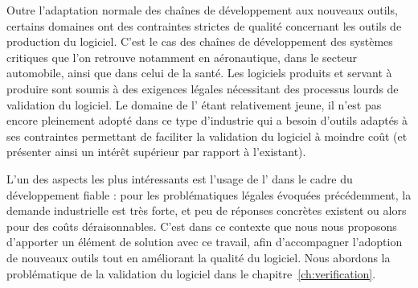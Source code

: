 Outre l'adaptation normale des chaînes de développement aux nouveaux outils,
certains domaines ont des contraintes strictes de qualité concernant les outils
de production du logiciel. C'est le cas des chaînes de développement des
systèmes critiques que l'on retrouve notamment en aéronautique, dans le secteur
automobile, ainsi que dans celui de la santé. Les logiciels produits et servant
à produire sont soumis à des exigences légales nécessitant des processus lourds
de validation du logiciel. Le domaine de l'{\idm} étant relativement
jeune, il n'est pas encore pleinement adopté dans ce type d'industrie qui a
besoin d'outils adaptés à ses contraintes permettant de faciliter la validation
du logiciel à moindre coût (et présenter ainsi un intérêt supérieur par rapport
à l'existant).

L'un des aspects les plus intéressants est l'usage de l'{\idm} dans le cadre du
développement fiable : pour les problématiques légales évoquées précédemment, la
demande industrielle est très forte, et peu de réponses concrètes existent ou
alors pour des coûts déraisonnables. C'est dans ce contexte que nous nous
proposons d'apporter un élément de solution avec ce travail, afin d'accompagner
l'adoption de nouveaux outils tout en améliorant la qualité du logiciel. Nous
abordons la problématique de la validation du logiciel dans le
chapitre~\ref{ch:verification}.





